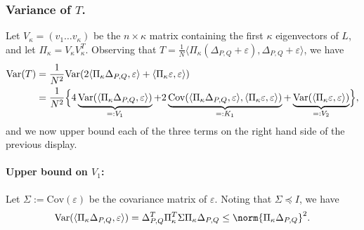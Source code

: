 \documentclass{article}
\newcommand{\dotp}[2]{\langle #1, #2 \rangle}
\newcommand{\Var}{\mathrm{Var}}
\newcommand{\Cov}{\mathrm{Cov}}
\newcommand{\1}{\mathbf{1}}
\theoremstyle{alden}
\theoremstyle{aldenthm}
\theoremstyle{definition}
\theoremstyle{remark}
\begin{document}
\subsubsection{Variance of $T$.}
Let $V_{\kappa} = (v_1\ldots v_{\kappa})$ be the $n \times \kappa$ matrix containing the first $\kappa$ eigenvectors of $L$, and let $\Pi_{\kappa} = V_{\kappa} V_{\kappa}^T$. Observing that $T = \frac{1}{N}\dotp{\Pi_{\kappa}(\Delta_{P,Q} + \varepsilon)}{\Delta_{P,Q} + \varepsilon}$, we have
\begin{align}
\Var(T) & = \frac{1}{N^2}\Var(2\dotp{\Pi_{\kappa}\Delta_{P,Q}}{\varepsilon} + \dotp{\Pi_{\kappa}\varepsilon}{\varepsilon}) \nonumber \\
& = \frac{1}{N^2}\Bigl\{4\underbrace{\Var(\dotp{\Pi_{\kappa}\Delta_{P,Q}}{\varepsilon})}_{=: V_1} + 2\underbrace{\Cov(\dotp{\Pi_{\kappa}\Delta_{P,Q}}{\varepsilon},\dotp{\Pi_{\kappa}\varepsilon}{\varepsilon})}_{=: K_1} + \underbrace{\Var(\dotp{\Pi_{\kappa}\varepsilon}{\varepsilon})}_{=:V_2}\Bigr\}, \label{eqn:var}
\end{align}
and we now upper bound each of the three terms on the right hand side of the previous display.
\paragraph{Upper bound on $V_1$:}
Let $\Sigma := \Cov(\varepsilon)$ be the covariance matrix of $\varepsilon$. Noting that $\Sigma \preceq I$, we have
\begin{equation}
\label{eqn:var1}
\Var(\dotp{\Pi_{\kappa}\Delta_{P,Q}}{\varepsilon}) =\Delta_{P,Q}^T \Pi_{\kappa}^T \Sigma \Pi_{\kappa} \Delta_{P,Q} \leq \norm{\Pi_{\kappa}\Delta_{P,Q}}^2.
\end{equation}
\end{document}
